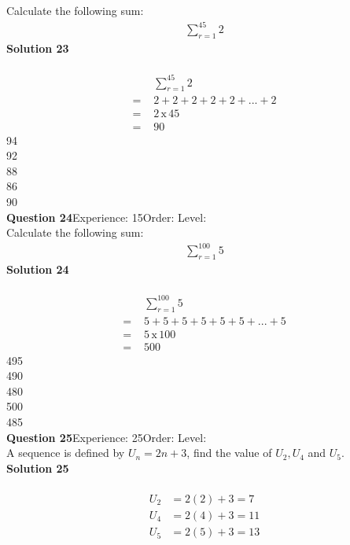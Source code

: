 \documentclass{article}
\begin{document}
Calculate the following sum:
\begin{align*}
\sum_{r=1}^{45} 2
\end{align*}
\noindent\textbf{Solution 23}\\[2pt]
\\[-10pt]\begin{align*}
&\sum_{r=1}^{45} 2\\[2pt]
=\,\,&2+2+2+2+2+...+2\\[2pt]
=\,\,&2 \, \text{x} \, 45\\[2pt]
=\,\,&90
\end{align*}
94\\
92\\
88\\
86\\
90\\
\noindent\textbf{Question 24}\hspace{20pt}Experience: 15\hspace{20pt}Order: \hspace{20pt}Level: \\[2pt]
Calculate the following sum:
\begin{align*}
\sum_{r=1}^{100} 5
\end{align*}
\noindent\textbf{Solution 24}\\[2pt]
\\[-10pt]\begin{align*}
&\sum_{r=1}^{100} 5\\[2pt]
=\,\,&5+5+5+5+5+5+...+5\\[2pt]
=\,\,&5 \, \text{x} \, 100\\[2pt]
=\,\,&500
\end{align*}
495\\
490\\
480\\
500\\
485\\
\noindent\textbf{Question 25}\hspace{20pt}Experience: 25\hspace{20pt}Order: \hspace{20pt}Level: \\[2pt]
A sequence is defined by $U_n=2n+3$, find the value of $U_2, U_4$ and $U_5$.\\[4pt]
\noindent\textbf{Solution 25}\\[2pt]
\\[-10pt]\begin{align*}
U_2&=2(2)+3=7\\[2pt]
U_4&=2(4)+3=11\\[2pt]
U_5&=2(5)+3=13\\[2pt]
\end{align*}
\end{document}
